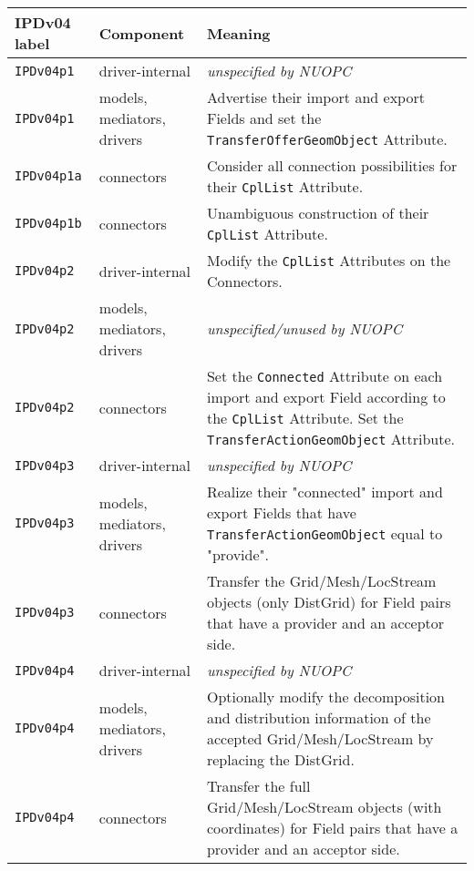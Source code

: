 \vspace*{3ex}
\begin{longtable}[h]{|p{}|p{}|p{}|}
     \hline\hline
     {\bf IPDv04 label} & {\bf Component} & {\bf Meaning}\\
     \hline\hline
     {\tt IPDv04p1}   & driver-internal             & {\em unspecified by NUOPC}\\ \hline
     {\tt IPDv04p1}   & models, mediators, drivers  & Advertise their import and export Fields and set the {\tt TransferOfferGeomObject} Attribute.\\ \hline
     {\tt IPDv04p1a}  & connectors                  & Consider all connection possibilities for their {\tt CplList} Attribute.\\ \hline
     {\tt IPDv04p1b}  & connectors                  & Unambiguous construction of their {\tt CplList} Attribute.\\ \hline
     {\tt IPDv04p2}   & driver-internal             & Modify the {\tt CplList} Attributes on the Connectors.\\ \hline
     {\tt IPDv04p2}   & models, mediators, drivers  & {\em unspecified/unused by NUOPC}\\ \hline
     {\tt IPDv04p2}   & connectors                  & Set the {\tt Connected} Attribute on each import and export Field according to the {\tt CplList} Attribute. Set the {\tt TransferActionGeomObject} Attribute.\\ \hline
     {\tt IPDv04p3}   & driver-internal             & {\em unspecified by NUOPC}\\ \hline
     {\tt IPDv04p3}   & models, mediators, drivers  & Realize their "connected" import and export Fields that have {\tt TransferActionGeomObject} equal to "provide".\\ \hline
     {\tt IPDv04p3}   & connectors                  & Transfer the Grid/Mesh/LocStream objects (only DistGrid) for Field pairs that have a provider and an acceptor side.\\ \hline
     {\tt IPDv04p4}   & driver-internal             & {\em unspecified by NUOPC}\\ \hline
     {\tt IPDv04p4}   & models, mediators, drivers  & Optionally modify the decomposition and distribution information of the accepted Grid/Mesh/LocStream by replacing the DistGrid.\\ \hline
     {\tt IPDv04p4}   & connectors                  & Transfer the full Grid/Mesh/LocStream objects (with coordinates) for Field pairs that have a provider and an acceptor side.\\ \hline

\end{longtable}
